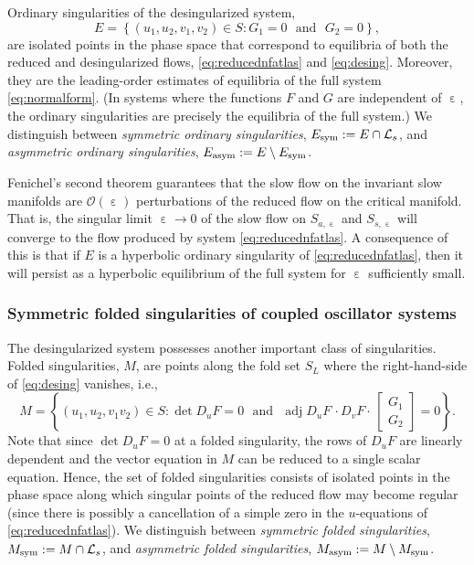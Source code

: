 \documentclass[10pt,onecolumn]{article}
\theoremstyle{plain}
\DeclareMathOperator{\eps}{\varepsilon}
\begin{document}
Ordinary singularities of the desingularized system,
%
\[ E = \left\{ (u_1,u_2,v_1,v_2) \in S : G_1  = 0 \,\, \text{ and } \,\, G_2 = 0 \right\}, \]
%
are isolated points in the phase space that correspond to equilibria of both the reduced and desingularized flows, \eqref{eq:reducednfatlas} and \eqref{eq:desing}. Moreover, they are the leading-order estimates of equilibria of the full system \eqref{eq:normalform}. (In systems where the functions $F$ and $G$ are independent of $\eps$, the ordinary singularities are precisely the equilibria of the full system.) We distinguish between {\em symmetric ordinary singularities}, $E_{\rm sym} := E \cap \mathcal L_s$, and {\em asymmetric ordinary singularities}, $E_{\rm asym} := E \setminus E_{\rm sym}$.

Fenichel's second theorem \cite{Fenichel1979,Jones1995} guarantees that the slow flow on the invariant slow manifolds are $\mathcal O(\eps)$ perturbations of the reduced flow on the critical manifold. That is, the singular limit $\eps \to 0$ of the slow flow on $S_{a,\eps}$ and $S_{s,\eps}$ will converge to the flow produced by system \eqref{eq:reducednfatlas}. A consequence of this is that if $E$ is a hyperbolic ordinary singularity of \eqref{eq:reducednfatlas}, then it will persist as a hyperbolic equilibrium of the full system for $\eps$ sufficiently small.


\subsubsection{Symmetric folded singularities of coupled oscillator systems}
The desingularized system possesses another important class of singularities. Folded singularities, $M$, are points along the fold set $S_L$ where the right-hand-side of \eqref{eq:desing} vanishes, i.e.,
%
\[ M = \left\{ (u_1,u_2,v_1v_2) \in S : \det D_u F = 0 \,\, \text{ and } \,\, \operatorname{adj}D_u F \, \cdot  D_v F \cdot \, \begin{bmatrix} G_1 \\ G_2 \end{bmatrix} = 0 \right\}. \]
%
Note that since $\det D_u F = 0$ at a folded singularity, the rows of $D_u F$ are linearly dependent and the vector equation in $M$ can be reduced to a single scalar equation. Hence, the set of folded singularities consists of isolated points in the phase space along which singular points of the reduced flow may become regular (since there is possibly a cancellation of a simple zero in the $u$-equations of \eqref{eq:reducednfatlas}). We distinguish between {\em symmetric folded singularities}, $M_{\rm sym} := M \cap \mathcal L_s$, and {\em asymmetric folded singularities}, $M_{\rm asym} := M \setminus M_{\rm sym}$.
\end{document}
